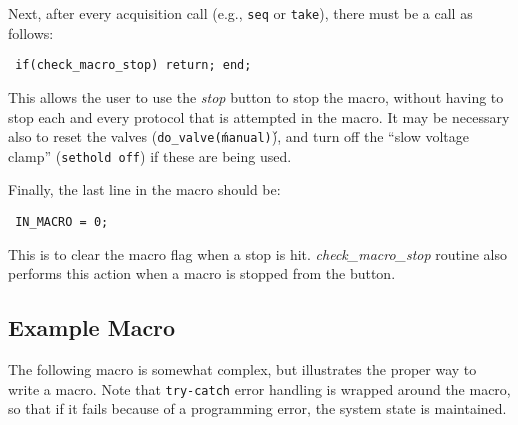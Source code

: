 \documentclass[11pt, letterpaper, titlepage]{paper}
\begin{document}
Next, after every acquisition call (e.g., \texttt{seq} or 
\texttt{take}), there must be a call as follows:

\begin{verbatim} if(check_macro_stop) return; end; \end{verbatim}

This allows the user to use the \textsl{stop} button to stop the 
macro, without having to stop each and every protocol that is 
attempted in the macro. It may be necessary also to reset the 
valves (\texttt{do\_valve(\'manual\')}), and turn off the ``slow 
voltage clamp'' (\texttt{sethold off}) if these are being used.

Finally, the last line in the macro should be:

\begin{verbatim} IN_MACRO = 0; \end{verbatim}

This is to clear the macro flag when a stop is hit. 
\textsl{check\_macro\_stop} routine also performs this action when 
a macro is stopped from the button.

\subsection{Example Macro}

The following macro is somewhat complex, but illustrates the 
proper way to write a macro. Note that \texttt{try-catch} error 
handling is wrapped around the macro, so that if it fails because 
of a programming error, the system state is maintained.
\end{document}
